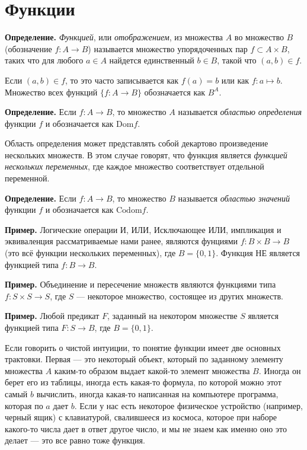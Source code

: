\section{Функции}

{\bfseries Определение.} {\slshape Функцией}, или {\slshape отображением}, из множества $A$ во множество $B$ (обозначение $f:A\to B$) называется множество упорядоченных пар $f\subset A\times B$, таких что для любого $a\in A$ найдется единственный $b\in B$, такой что $(a, b) \in f$.

Если $(a, b) \in f$, то это часто записывается как $f(a) = b$ или как $f:a \mapsto b$. Множество всех функций $\{f: A\to B\}$ обозначается как $B^A$.

{\bfseries Определение.} Если $f:A \to B$, то множество $A$ называется {\slshape областью определения} функции $f$ и обозначается как $\mathrm{Dom} f$.

Область определения может представлять собой декартово произведение нескольких множеств. В этом случае говорят, что функция является {\slshape функцией нескольких переменных}, где каждое множество соответствует отдельной переменной.

{\bfseries Определение.} Если $f:A \to B$, то множество $B$ называется {\slshape областью значений} функции $f$ и обозначается как $\mathrm{Codom} f$.

{\bfseries Пример.} Логические операции И, ИЛИ, Исключающее ИЛИ, импликация и эквиваленция рассматриваемые нами ранее, являются фунциями $f:B\times B \to B$ (это всё функции нескольких переменных), где $B = \{0, 1\}$. Функция НЕ является функцией типа $f: B \to B$.

{\bfseries Пример.} Объединение и пересечение множеств являются функциями типа $f: S \times S \to S$, где $S$ — некоторое множество, состоящее из других множеств.

{\bfseries Пример.} Любой предикат $F$, заданный на некотором множестве $S$ является функцией типа $F: S \to B$, где $B = \{0, 1\}$.

Если говорить о чистой интуиции, то понятие функции имеет две основных трактовки. Первая — это некоторый объект, который по заданному элементу множества $A$ каким-то образом выдает какой-то элемент множества $B$. Иногда он берет его из таблицы, иногда есть какая-то формула, по которой можно этот самый $b$ вычислить, иногда какая-то написанная на компьютере программа, которая по $a$ дает $b$. Если у нас есть некоторое физическое устройство (например, черный ящик) с клавиатурой, свалившееся из космоса, которое при наборе какого-то числа дает в ответ другое число, и мы не знаем как именно оно это делает — это все равно тоже функция.

